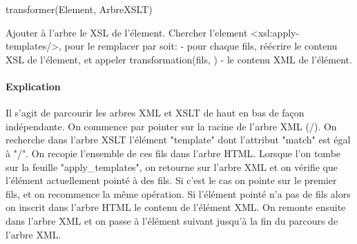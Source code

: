 	\begin{algorithm}
	\caption{transformer(Element, ArbreXSLT)}    
    \begin{algorithmic}
		\STATE Ajouter à l'arbre le XSL de l'élement.
		\STATE Chercher l'element <xsl:apply-templates/>, pour le remplacer par soit:
			\STATE - pour chaque fils, réécrire le contenu XSL de l'élement, et appeler transformation(fils, ) 
			\STATE - le contenu XML de l'élément.
	\end{algorithmic}
    \end{algorithm}
 
	\paragraph{Explication}
	    Il s'agit de parcourir les arbres XML et XSLT de haut en bas de façon indépendante.
	    On commence par pointer sur la racine de l'arbre XML (/). On recherche dans l'arbre XSLT l'élément "template" dont l'attribut "match" est égal à "/".
	    On recopie l'ensemble de ces fils dans l'arbre HTML. Lorsque l'on tombe sur la feuille "apply\_templates", on retourne sur l'arbre XML et on vérifie que l'élément actuellement pointé à des fils. Si c'est le cas on pointe sur le premier fils, et on recommence la même opération. Si l'élément pointé n'a pas de fils alors on inscrit dans l'arbre HTML le contenu de l'élément XML. On remonte ensuite dans l'arbre XML et on passe à l'élément suivant jusqu'à la fin du parcours de l'arbre XML.


